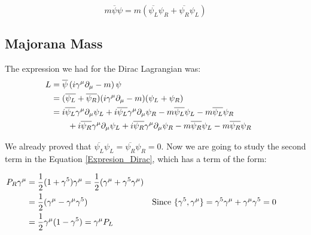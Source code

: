 \begin{equation}
  m \overline{\psi} \psi = m (\overline{\psi_L} \psi_R + \overline{\psi_R}\psi_L)
\end{equation}

\subsection{Majorana Mass}

The expression we had for the Dirac Lagrangian was: 
\begin{align}
  &\begin{aligned}
    \mathllap{L} &= \overline{\psi} \left( i \gamma ^\mu \partial_{\mu} - m \right) \psi \\
    \mathllap{}  &= (\overline{\psi_L} + \overline{\psi_R})( i \gamma ^\mu \partial_{\mu} - m)(\psi_L + \psi_R) \\
    \mathllap{}\label{Expresion_Dirac}  &= i \overline{\psi_L} \gamma ^\mu \partial_{\mu} \psi_L + i \overline{\psi_L} \gamma ^\mu   \partial_{\mu} \psi_R - m \overline{\psi_L} \psi_L - m \overline{\psi_L} \psi_R \\
  &\qquad + i \overline{\psi_R} \gamma ^\mu \partial_{\mu} \psi_L + i \overline{\psi_R} \gamma^{\mu} \partial_{\mu} \psi_R - m \overline{\psi_R} \psi_L - m \overline{\psi_R} \psi_R \\
  \end{aligned}
\end{align}

We already proved that $\overline{\psi_L}\psi_L = \overline{\psi_R}\psi_R = 0$. Now we are going to study the second term in the Equation \ref{Expresion_Dirac}, which has a term of the form:

\begin{align}
  &\begin{aligned}
     \mathllap{P_R\gamma^\mu}  &= \frac{1}{2} (1 + \gamma^5)\gamma^\mu = \frac{1}{2} (\gamma^\mu + \gamma^5 \gamma^\mu) \\        
     \mathllap{}            &= \frac{1}{2} (\gamma^\mu - \gamma^\mu \gamma^5) & \text{Since $\{\gamma^5,\gamma^\mu\} = \gamma^5\gamma^\mu + \gamma^\mu \gamma^5 = 0$} \\
     \mathllap{}            &= \frac{1}{2} \gamma^\mu (1 - \gamma^5) = \gamma^\mu P_L 
  &\end{aligned}
\end{align}

